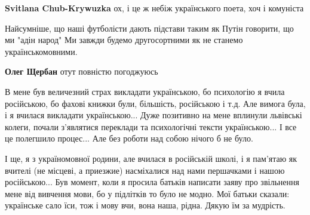 \begin{itemize}
\begin{itemize}
 
\textbf{Svitlana Chub-Krywuzka} ох, і це ж небіж українського поета, хоч і комуніста
\end{itemize}

 

Найсумніше, що наші футболісти дають підстави таким як Путін говорити, що ми
"адін народ" Ми завжди будемо другосортними як не станемо українськомовними.

\begin{itemize}
 
\textbf{Олег Щербан} отут повністю погоджуюсь
\end{itemize}

 

В мене був величезний страх викладати українською, бо психологію я вчила
російською, бо фахові книжки були, більшість, російською і т.д. Але вимога
була, і я вчилася викладати українською... Дуже позитивно на мене вплинули
львівські колеги, почали з'являтися переклади та психологічні тексти
українською... І все це полегшило процес... Але без роботи над собою нічого б
не було.

І ще, я з україномовної родини, але вчилася в російській школі, і я пам'ятаю як
вчителі (не місцеві, а приезжие) насміхалися над нами першачками і нашою
російською... Був момент, коли я просила батьків написати заяву про звільнення
мене від вивчення мови, бо у підлітків то було не модно. Мої батьки сказали:
українське сало їси, тож і мову вчи, вона наша, рідна. Дякую їм за мудрість.


\end{itemize}
